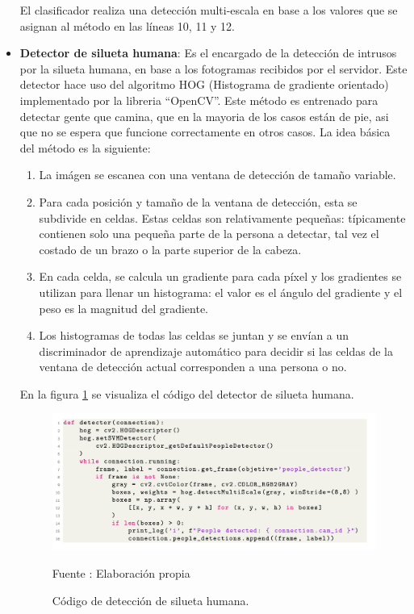 \begin{itemize}
    El clasificador realiza una detección multi-escala en base a los valores que se asignan al método en las líneas 10, 11 y 12.\\
    \item \textbf{Detector de silueta humana}:
    Es el encargado de la detección de intrusos por la silueta humana, en base a los fotogramas recibidos por el servidor. Este detector hace uso del algoritmo HOG (Histograma de gradiente orientado) implementado por la libreria ``OpenCV''. Este método es entrenado para detectar gente que camina, que en la mayoria de los casos están de pie, asi que no se espera que funcione correctamente en otros casos.
    La idea básica del método es la siguiente:\\
    
    \begin{enumerate}
        \item La imágen se escanea con una ventana de detección de tamaño variable.
        \item Para cada posición y tamaño de la ventana de detección, esta se subdivide en celdas. Estas celdas son relativamente pequeñas: típicamente contienen solo una pequeña parte de la persona a detectar, tal vez el costado de un brazo o la parte superior de la cabeza.
        \item En cada celda, se calcula un gradiente para cada píxel y los gradientes se utilizan para llenar un histograma: el valor es el ángulo del gradiente y el peso es la magnitud del gradiente.
        \item Los histogramas de todas las celdas se juntan y se envían a un discriminador de aprendizaje automático para decidir si las celdas de la ventana de detección actual corresponden a una persona o no.
    \end{enumerate}
    
    En la figura \ref{fig:human_detector} se visualiza el código del detector de silueta humana.\\
    
    \begin{figure}[H]
        \begin{center}
            \includegraphics[width=16cm]{img/capitulo_5/human_detector.png}
        \end{center}
        \begin{center}
            \caption{Código de detección de silueta humana.}
            Fuente : Elaboración propia
            \label{fig:human_detector}
        \end{center}
    \end{figure}
    

\end{itemize}
